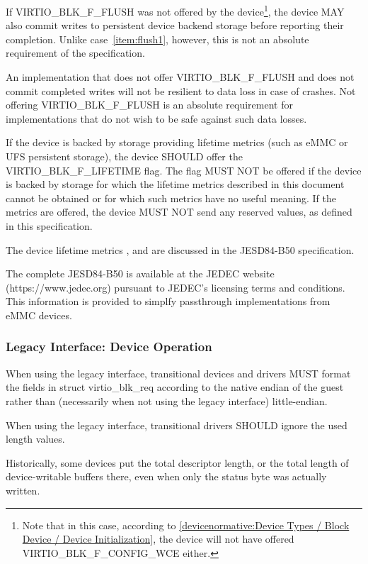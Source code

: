 If VIRTIO_BLK_F_FLUSH was not offered by the
  device\footnote{Note that in this case, according to
  \ref{devicenormative:Device Types / Block Device / Device Initialization},
  the device will not have offered VIRTIO_BLK_F_CONFIG_WCE either.}, the
device MAY also commit writes to persistent device backend storage before
reporting their completion.  Unlike case~\ref{item:flush1}, however, this
is not an absolute requirement of the specification.

\begin{note}
  An implementation that does not offer VIRTIO_BLK_F_FLUSH and does not commit
  completed writes will not be resilient to data loss in case of crashes.
  Not offering VIRTIO_BLK_F_FLUSH is an absolute requirement
  for implementations that do not wish to be safe against such data losses.
\end{note}

If the device is backed by storage providing lifetime metrics (such as eMMC
or UFS persistent storage), the device SHOULD offer the VIRTIO_BLK_F_LIFETIME
flag. The flag MUST NOT be offered if the device is backed by storage for which
the lifetime metrics described in this document cannot be obtained or for which
such metrics have no useful meaning. If the metrics are offered, the device MUST NOT
send any reserved values, as defined in this specification.

\begin{note}
  The device lifetime metrics , 
  and  are discussed in the JESD84-B50 specification.

  The complete JESD84-B50 is available at the JEDEC website (https://www.jedec.org)
  pursuant to JEDEC's licensing terms and conditions. This information is provided to
  simplfy passthrough implementations from eMMC devices.
\end{note}

\subsubsection{Legacy Interface: Device Operation}\label{sec:Device Types / Block Device / Device Operation / Legacy Interface: Device Operation}
When using the legacy interface, transitional devices and drivers
MUST format the fields in struct virtio_blk_req
according to the native endian of the guest rather than
(necessarily when not using the legacy interface) little-endian.

When using the legacy interface, transitional drivers
SHOULD ignore the used length values.
\begin{note}
Historically, some devices put the total descriptor length,
or the total length of device-writable buffers there,
even when only the status byte was actually written.
\end{note}

